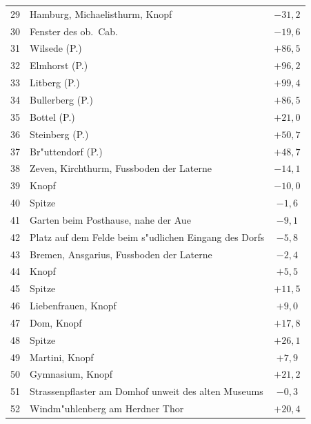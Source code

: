 \documentclass[12pt,a4paper]{article}
\theoremstyle{plain}
\theoremstyle{definition}
\theoremstyle{remark}
\begin{document}
\newpage
\begin{tabular}{r|l|c}
\hline
29 & Hamburg, Michaelisthurm, Knopf & $-31,\!2$ \\
30 & \quad\quad\quad\quad\quad\quad\quad\quad\quad\quad Fenster des ob.\ Cab. & $-19,\!6$ \\
31 & Wilsede (P.) & $+86,\!5$ \\
32 & Elmhorst (P.) & $+96,\!2$ \\
33 & Litberg (P.) & $+99,\!4$ \\
34 & Bullerberg (P.) & $+86,\!5$ \\
35 & Bottel (P.) & $+21,\!0$ \\
36 & Steinberg (P.) & $+50,\!7$ \\
37 & Br"uttendorf (P.) & $+48,\!7$ \\
38 & Zeven, Kirchthurm, Fussboden der Laterne & $-14,\!1$ \\
39 & \quad\quad\quad\quad\quad\quad\quad\quad Knopf & $-10,\!0$ \\
40 & \quad\quad\quad\quad\quad\quad\quad\quad Spitze & $-1,\!6$ \\
41 & \quad\quad\quad\quad\quad\quad\quad Garten beim Posthause, nahe der Aue & $-9,\!1$ \\
42 & \quad\quad\quad\quad\quad\quad\quad Platz auf dem Felde beim s"udlichen Eingang des Dorfs & $-5,\!8$ \\
43 & Bremen, Ansgarius, Fussboden der Laterne & $-2,\!4$ \\
44 & \quad\quad\quad\quad\quad\quad\quad\quad\quad\quad\quad Knopf & $+5,\!5$ \\
45 & \quad\quad\quad\quad\quad\quad\quad\quad\quad\quad\quad Spitze & $+11,\!5$ \\
46 & \quad\quad\quad\quad\quad\quad\quad\quad\quad\quad\quad Liebenfrauen, Knopf & $+9,\!0$ \\
47 & \quad\quad\quad\quad\quad\quad\quad\quad\quad\quad\quad Dom, Knopf & $+17,\!8$ \\
48 & \quad\quad\quad\quad\quad\quad\quad\quad\quad\quad\quad \quad\quad\quad\quad Spitze & $+26,\!1$ \\
49 & \quad\quad\quad\quad\quad\quad\quad\quad\quad\quad\quad Martini, Knopf & $+7,\!9$ \\
50 & \quad\quad\quad\quad\quad\quad\quad\quad\quad\quad\quad Gymnasium, Knopf & $+21,\!2$ \\
51 & \quad\quad\quad\quad\quad\quad\quad\quad\quad\quad\quad Strassenpflaster am Domhof unweit des alten Museums & $-0,\!3$ \\
52 & \quad\quad\quad\quad\quad\quad\quad\quad\quad\quad\quad Windm"uhlenberg am Herdner Thor & $+20,\!4$ \\

\end{tabular}
\end{document}
